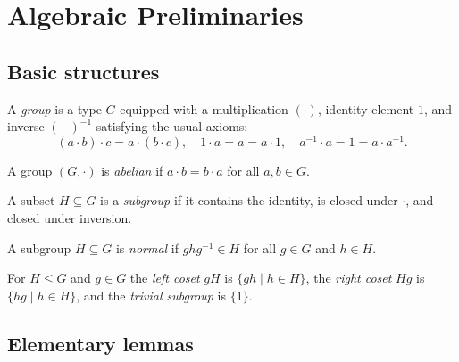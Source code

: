 
\chapter{Algebraic Preliminaries}

\section{Basic structures}

\begin{definition}[Group]\label{def:mygroup}
A \emph{group} is a type $G$ equipped with a multiplication
$(\cdot)$, identity element $1$, and inverse $(-)^{-1}$ satisfying
the usual axioms:
\[
(a\cdot b)\cdot c = a\cdot(b\cdot c),
\quad
1\cdot a = a = a\cdot1,
\quad
a^{-1}\!\cdot a = 1 = a\cdot a^{-1}.
\]
\end{definition}

\begin{definition}\label{def:abegroup}
A group $(G,\cdot)$ is \emph{abelian} if $a\cdot b = b\cdot a$ for
all $a,b\in G$.
\end{definition}

\begin{definition}[Subgroup]\label{def:mysubgroup}
A subset $H\subseteq G$ is a \emph{subgroup} if it contains the
identity, is closed under $\cdot$, and closed under inversion.
\end{definition}

\begin{definition}\label{def:normalsubgroup}
A subgroup $H\subseteq G$ is \emph{normal} if $g h g^{-1}\in H$ for
all $g\in G$ and $h\in H$.
\end{definition}

\begin{definition}\label{def:cosets}
For $H\le G$ and $g\in G$ the \emph{left coset} $gH$ is
$\{gh\mid h\in H\}$, the \emph{right coset} $Hg$ is
$\{h g\mid h\in H\}$, and the \emph{trivial subgroup} is
$\{1\}$.
\end{definition}


\section{Elementary lemmas}

